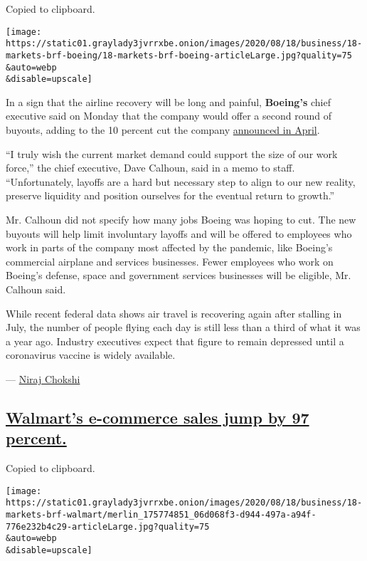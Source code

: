 Copied to clipboard.

\texttt{[image: https://static01.graylady3jvrrxbe.onion/images/2020/08/18/business/18-markets-brf-boeing/18-markets-brf-boeing-articleLarge.jpg?quality=75\\\&auto=webp\\\&disable=upscale]}

In a sign that the airline recovery will be long and painful,
\textbf{Boeing's} chief executive said on Monday that the company would
offer a second round of buyouts, adding to the 10 percent cut the
company
\href{https://www.nytimes3xbfgragh.onion/2020/04/29/business/boeing-layoffs-coronavirus.html}{announced
in April}.

``I truly wish the current market demand could support the size of our
work force,'' the chief executive, Dave Calhoun, said in a memo to
staff. ``Unfortunately, layoffs are a hard but necessary step to align
to our new reality, preserve liquidity and position ourselves for the
eventual return to growth.''

Mr. Calhoun did not specify how many jobs Boeing was hoping to cut. The
new buyouts will help limit involuntary layoffs and will be offered to
employees who work in parts of the company most affected by the
pandemic, like Boeing's commercial airplane and services businesses.
Fewer employees who work on Boeing's defense, space and government
services businesses will be eligible, Mr. Calhoun said.

While recent federal data shows air travel is recovering again after
stalling in July, the number of people flying each day is still less
than a third of what it was a year ago. Industry executives expect that
figure to remain depressed until a coronavirus vaccine is widely
available.

--- \href{https://www.nytimes3xbfgragh.onion/by/niraj-chokshi}{Niraj
Chokshi}

\hypertarget{walmarts-e-commerce-sales-jump-by-97-percent}{%
\subsection{\texorpdfstring{\protect\hyperlink{walmarts-e-commerce-sales-jump-by-97-percent}{Walmart's
e-commerce sales jump by 97
percent.}}{Walmart's e-commerce sales jump by 97 percent.}}\label{walmarts-e-commerce-sales-jump-by-97-percent}}

Copied to clipboard.

\texttt{[image: https://static01.graylady3jvrrxbe.onion/images/2020/08/18/business/18-markets-brf-walmart/merlin\_175774851\_06d068f3-d944-497a-a94f-776e232b4c29-articleLarge.jpg?quality=75\\\&auto=webp\\\&disable=upscale]}

